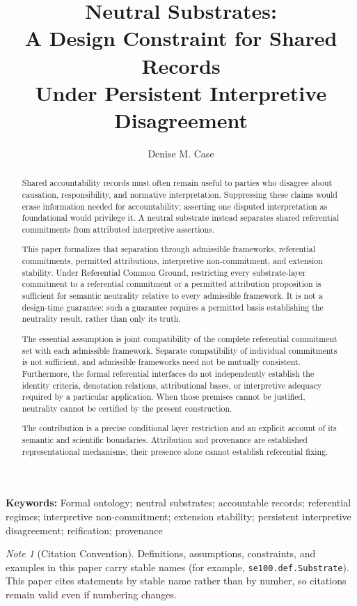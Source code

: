 \documentclass[11pt]{article}
\title{
Neutral Substrates:\\
A Design Constraint for Shared Records\\
Under Persistent Interpretive Disagreement
}
\author{Denise M. Case}
\affil{\small Department of Computer Science and Information Systems\\
Northwest Missouri State University, Maryville, MO, USA\\}
\date{}
\theoremstyle{plain}
\theoremstyle{definition}
\theoremstyle{remark}
\newtheorem*{note*}{Note}
\providecommand{\keywords}[1]{\vspace{0.5em}\noindent\textbf{Keywords: }\small #1}
\begin{document}
\maketitle
\vspace{-2em}

\begin{abstract}
Shared accountability records must often remain useful to parties
who disagree about causation, responsibility, and normative interpretation.
Suppressing these claims would erase information needed for accountability;
asserting one disputed interpretation as foundational would privilege it.
A neutral substrate instead separates shared referential commitments
from attributed interpretive assertions.

This paper formalizes that separation through admissible frameworks,
referential commitments, permitted attributions, interpretive
non-commitment, and extension stability.
Under Referential Common Ground,
restricting every substrate-layer commitment to a referential commitment
or a permitted attribution proposition is sufficient for semantic neutrality
relative to every admissible framework.
It is not a design-time guarantee: such a guarantee requires a permitted basis
establishing the neutrality result, rather than only its truth.

The essential assumption is joint compatibility of the complete
referential commitment set with each admissible framework.
Separate compatibility of individual commitments is not sufficient,
and admissible frameworks need not be mutually consistent.
Furthermore, the formal referential interfaces do not independently
establish the identity criteria, denotation relations, attributional bases,
or interpretive adequacy required by a particular application.
When those premises cannot be justified, neutrality cannot be certified
by the present construction.

The contribution is a precise conditional layer restriction and
an explicit account of its semantic and scientific boundaries.
Attribution and provenance are established representational mechanisms;
their presence alone cannot establish referential fixing.
\end{abstract}


\keywords{
  Formal ontology;
  neutral substrates;
  accountable records;
  referential regimes;
  interpretive non-commitment;
  extension stability;
  persistent interpretive disagreement;
  reification;
  provenance
}

\begin{note*}[Citation Convention]
  Definitions, assumptions, constraints, and examples in this paper carry stable
  names (for example, \texttt{se100.def.Substrate}).
  This paper cites statements by stable name rather than by number,
  so citations remain valid even if numbering changes.
\end{note*}
\end{document}
